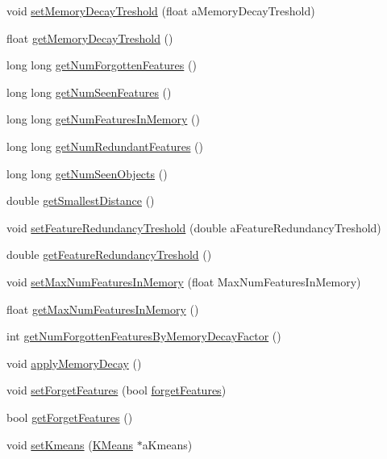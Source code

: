 \begin{DoxyCompactItemize}
\item 
void \hyperlink{class_memory_a035e450994077e442b5607e72b22cb0c}{set\+Memory\+Decay\+Treshold} (float a\+Memory\+Decay\+Treshold)
\item 
float \hyperlink{class_memory_ada0d9f016a8913fd6ca9c959c3a7f49a}{get\+Memory\+Decay\+Treshold} ()
\item 
long long \hyperlink{class_memory_a71384aeaf8830770030cd7e7fc8d4342}{get\+Num\+Forgotten\+Features} ()
\item 
long long \hyperlink{class_memory_aff0dd81352bffafc0989c71721f5c685}{get\+Num\+Seen\+Features} ()
\item 
long long \hyperlink{class_memory_ae5b168514b6b6bf8121526a6216a8b4e}{get\+Num\+Features\+In\+Memory} ()
\item 
long long \hyperlink{class_memory_a5ea7ba5bae1d18a31b83b7a9cc5c30cb}{get\+Num\+Redundant\+Features} ()
\item 
long long \hyperlink{class_memory_aee4eb4b1f005a36bd59a0b159d6b8a32}{get\+Num\+Seen\+Objects} ()
\item 
double \hyperlink{class_memory_aaf033cd124262162565795054e4051c9}{get\+Smallest\+Distance} ()
\item 
void \hyperlink{class_memory_a9baac2bce6c671109e3ca334c82208dd}{set\+Feature\+Redundancy\+Treshold} (double a\+Feature\+Redundancy\+Treshold)
\item 
double \hyperlink{class_memory_a6fe889030e89f7d9e473b1fc276a2def}{get\+Feature\+Redundancy\+Treshold} ()
\item 
void \hyperlink{class_memory_a87e6f6575dde85b6e823370fe8b94d16}{set\+Max\+Num\+Features\+In\+Memory} (float Max\+Num\+Features\+In\+Memory)
\item 
float \hyperlink{class_memory_ab744bd3c27190554606e4ed4ed8ce44d}{get\+Max\+Num\+Features\+In\+Memory} ()
\item 
int \hyperlink{class_memory_a9b0d2e1ab33d34fef984581921acdf7e}{get\+Num\+Forgotten\+Features\+By\+Memory\+Decay\+Factor} ()
\item 
void \hyperlink{class_memory_a797dccf9387e072227b00208545581b9}{apply\+Memory\+Decay} ()
\item 
void \hyperlink{class_memory_a743603d575e4f65c0ca1292957fd9cf2}{set\+Forget\+Features} (bool \hyperlink{class_memory_ac3c18308c5e73bd2a54fcf5cb346c638}{forget\+Features})
\item 
bool \hyperlink{class_memory_a590b5d16853c7af4c97fbffab86b9c4b}{get\+Forget\+Features} ()
\item 
void \hyperlink{class_memory_a84fcb51d7b244744161b27fe731eb1dc}{set\+Kmeans} (\hyperlink{class_k_means}{K\+Means} $\ast$a\+Kmeans)

\end{DoxyCompactItemize}
